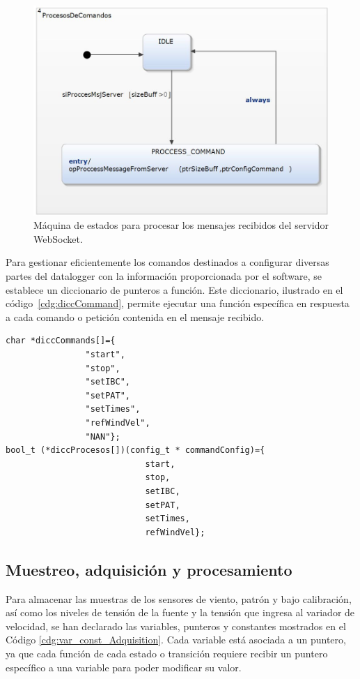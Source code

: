 \begin{figure}[H]
    \centering
    \includegraphics[width=0.6\linewidth]{Figuras/datalogger/Firmware/processComand.jpg}
    \caption{Máquina de estados para procesar los mensajes recibidos del servidor WebSocket.}
    \label{fig:processComand}
\end{figure}

Para gestionar eficientemente los comandos destinados a configurar diversas partes del datalogger con la información proporcionada por el software, se establece un diccionario de punteros a función. Este diccionario, ilustrado en el código~\ref{cdg:diccCommand}, permite ejecutar una función específica en respuesta a cada comando o petición contenida en el mensaje recibido.

\begin{lstlisting}[style=cstyle, caption={Funciones que permiten configurar o modificar el comportamiento del dataloger.}, label=cdg:diccCommand]
char *diccCommands[]={
				"start",
				"stop",
				"setIBC",
				"setPAT",
				"setTimes",
				"refWindVel",
				"NAN"};
bool_t (*diccProcesos[])(config_t * commandConfig)={
							start,
							stop,
							setIBC,
							setPAT,
							setTimes,
							refWindVel};

\end{lstlisting}


\subsection{Muestreo, adquisición y procesamiento}\label{sec:muestreo_adquisicion_procesamiento}

Para almacenar las muestras de los sensores de viento, patrón y bajo calibración, así como los niveles de tensión de la fuente y la tensión que ingresa al variador de velocidad, se han declarado las variables, punteros y constantes mostrados en el Código \ref{cdg:var_const_Adquisition}. Cada variable está asociada a un puntero, ya que cada función de cada estado o transición requiere recibir un puntero específico a una variable para poder modificar su valor.

